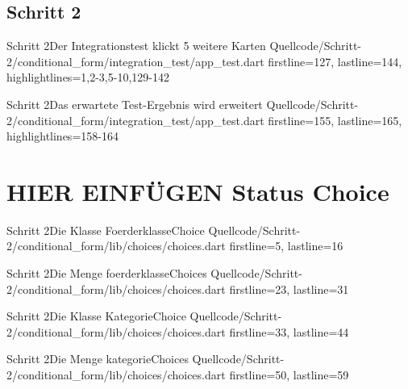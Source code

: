 \subsection{Schritt 2}

\begin{alexlisting}{Schritt 2}{Der Integrationstest klickt 5 weitere Karten}
  {Quellcode/Schritt-2/conditional_form/integration_test/app_test.dart}
  {firstline=127, lastline=144, highlightlines={1,2-3,5-10,129-142}}
  \label{lst:IntegrationstestKlickt5WeitereKarten}
\end{alexlisting}



\begin{alexlisting}{Schritt 2}{Das erwartete Test-Ergebnis wird erweitert}
  {Quellcode/Schritt-2/conditional_form/integration_test/app_test.dart}
  {firstline=155, lastline=165, highlightlines={158-164}}
  \label{lst:Schritt2ErwartetesTestErgebnisWirdErweitert}
\end{alexlisting}

\section{HIER EINFÜGEN Status Choice}
\begin{alexlisting}{Schritt 2}{Die Klasse FoerderklasseChoice}
  {Quellcode/Schritt-2/conditional_form/lib/choices/choices.dart}
  {firstline=5, lastline=16}
  \label{lst:Schritt2KlasseFoerderklasseChoice}
\end{alexlisting}

\begin{alexlisting}{Schritt 2}{Die Menge foerderklasseChoices}
  {Quellcode/Schritt-2/conditional_form/lib/choices/choices.dart}
  {firstline=23, lastline=31}
  \label{lst:Schritt2DieMengeFoerderklasseChoices}
\end{alexlisting}



\begin{alexlisting}{Schritt 2}{Die Klasse KategorieChoice}
  {Quellcode/Schritt-2/conditional_form/lib/choices/choices.dart}
  {firstline=33, lastline=44}
  \label{lst:Schritt2KlasseKategorieChoice}
\end{alexlisting}

\begin{alexlisting}{Schritt 2}{Die Menge kategorieChoices}
  {Quellcode/Schritt-2/conditional_form/lib/choices/choices.dart}
  {firstline=50, lastline=59}
  \label{lst:Schritt2MengeKategorieChoices}
\end{alexlisting}

